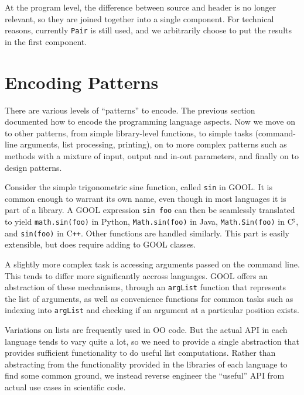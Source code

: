 \documentclass[sigplan,review,anonymous,prologue,dvipsnames]{acmart}
\newcommand{\Csharp}{C$^{\sharp}$}
\newcommand{\Cplusplus}{C\texttt{++}}
\begin{document}
At the program level, the difference between source and header is no
longer relevant, so they are joined together into a single component.
For technical reasons, currently \verb|Pair| is still used, and we arbitrarily
choose to put the results in the first component.


\section{Encoding Patterns} \label{sec:patterns}

There are various levels of ``patterns'' to encode. The previous section
documented how to encode the programming language aspects. Now we
move on to other patterns, from simple library-level functions, to
simple tasks (command-line arguments, list processing, printing), on to
more complex patterns such as methods with a mixture of input, output
and in-out parameters, and finally on to design patterns.

Consider the simple trigonometric sine function, called \verb|sin| in
GOOL. It is common enough to warrant its own name, even though in most
languages it is part of a library.  A GOOL expression \verb|sin foo|
can then be seamlessly translated to 
yield \verb|math.sin(foo)| in Python, \verb|Math.sin(foo)| in Java,
\verb|Math.Sin(foo)| in \Csharp, and \verb|sin(foo)| in \Cplusplus. Other
functions are handled similarly.  This part is easily extensible, but does
require adding to GOOL classes.

A slightly more complex task is accessing arguments passed on the command
line. This tends to differ more significantly accross languages. GOOL
offers an abstraction of these mechanisms, through an \verb|argList| function
that represents the list of arguments, as well as convenience functions for
common tasks such as indexing into \verb|argList| and checking if an argument
at a particular position exists.

Variations on lists are frequently used in OO code.  But the actual API
in each language tends to vary quite a lot, so we need to provide a single
abstraction that provides sufficient functionality to do useful list
computations.  Rather than abstracting from the functionality provided
in the libraries of each language to find some common ground, we instead
reverse engineer the ``useful'' API from actual use cases in scientific
code.  
\end{document}
